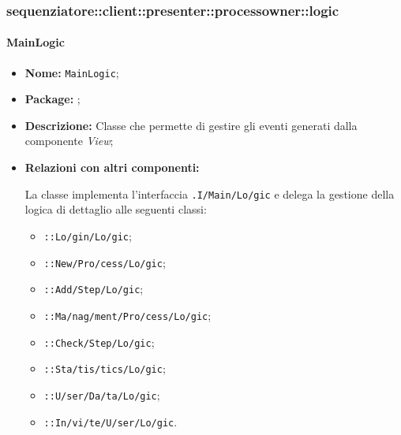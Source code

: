 \subsubsection{sequenziatore::client::presenter::processowner::logic}
\paragraph{MainLogic}
\begin{flushleft}
\begin{itemize}
\item \textbf{Nome:} \texttt{MainLogic};
\item \textbf{Package:} \texttt{\logicAdmin{}};
\item \textbf{Descrizione:} Classe che permette di gestire gli eventi generati dalla componente \textit{View};
\item \textbf{Relazioni con altri componenti:}
\begin{sloppypar}
La classe implementa l'interfaccia \texttt{\iLogicAdmin{}.I\fshyp{}Main\fshyp{}Lo\fshyp{}gic} e delega la gestione della logica di dettaglio alle seguenti classi:
\end{sloppypar}
\begin{itemize}
\item \texttt{\logicAdmin{}::Lo\fshyp{}gin\fshyp{}Lo\fshyp{}gic};
\item \texttt{\logicAdmin{}::New\fshyp{}Pro\fshyp{}cess\fshyp{}Lo\fshyp{}gic};
\item \texttt{\logicAdmin{}::Add\fshyp{}Step\fshyp{}Lo\fshyp{}gic};
\item \texttt{\logicAdmin{}::Ma\fshyp{}nag\fshyp{}ment\fshyp{}Pro\fshyp{}cess\fshyp{}Lo\fshyp{}gic};
\item \texttt{\logicAdmin{}::Check\fshyp{}Step\fshyp{}Lo\fshyp{}gic};
\item \texttt{\logicAdmin{}::Sta\fshyp{}tis\fshyp{}tics\fshyp{}Lo\fshyp{}gic};
\item \texttt{\logicAdmin{}::U\fshyp{}ser\fshyp{}Da\fshyp{}ta\fshyp{}Lo\fshyp{}gic};
\item \texttt{\logicAdmin{}::In\fshyp{}vi\fshyp{}te\fshyp{}U\fshyp{}ser\fshyp{}Lo\fshyp{}gic}.
\end{itemize}
\end{itemize}
\end{flushleft}

